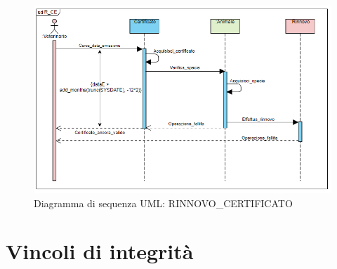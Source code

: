 \documentclass[12pt]{report}
\begin{document}
\begin{figure}[H]
\centering
\includegraphics[scale=1]{imgs/UML/sdR_CE.PNG}
\caption{Diagramma di sequenza UML: RINNOVO\_CERTIFICATO}
\end{figure}

\section{Vincoli di integrità}
\end{document}
